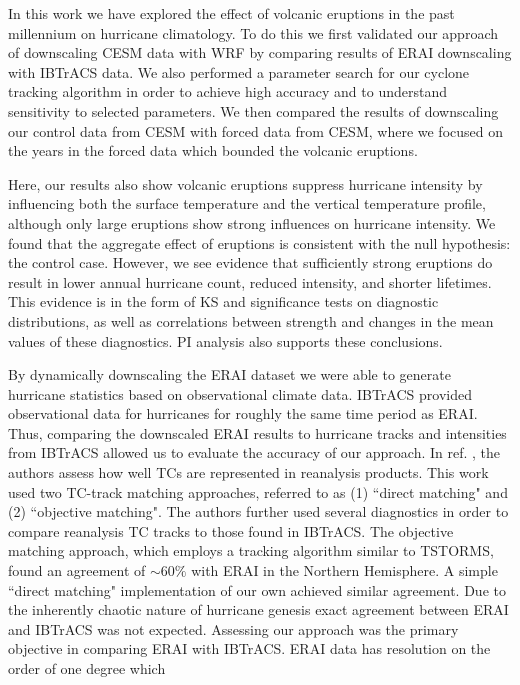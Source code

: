 \documentclass[phd,tocprelim]{cornell}
\begin{document}
In this work we have explored the effect of volcanic eruptions in 
the past millennium on hurricane climatology. To do this we first 
validated our approach of downscaling CESM data with WRF by comparing 
results of ERAI downscaling with IBTrACS data. We also performed a 
parameter search for our cyclone tracking algorithm in order to achieve 
high accuracy and to understand sensitivity to selected parameters. 
We then compared the results of downscaling our control data from CESM 
with forced data from CESM, where we focused on the years in the forced 
data which bounded the volcanic eruptions. 
\par
Here, our results also show volcanic eruptions suppress hurricane intensity by
influencing both the surface temperature and the vertical temperature
profile, although only large eruptions show strong influences on
hurricane intensity. We found that the aggregate effect of eruptions is 
consistent with the null hypothesis: the control case. However, we see evidence 
that sufficiently strong eruptions do result in lower annual hurricane count, 
reduced intensity, and shorter lifetimes. This evidence is in the form of 
KS and significance tests on diagnostic distributions, as well as 
correlations between strength and changes in the mean values of 
these diagnostics. PI analysis also supports these conclusions. 
\par
By dynamically downscaling the ERAI dataset we were able to generate 
hurricane statistics based on observational climate data. 
IBTrACS provided observational data for hurricanes for roughly the 
same time period as ERAI. Thus, comparing
the downscaled ERAI results to hurricane tracks and intensities from
IBTrACS allowed us to evaluate the accuracy of our approach. 
In ref. \cite{hodges2017well}, the authors assess how well TCs are
represented in reanalysis products. This work used two TC-track
matching approaches, referred to as (1) ``direct matching" and (2)
``objective matching". The authors further used several diagnostics in
order to compare reanalysis TC tracks to those found in IBTrACS. The
objective matching approach, which employs a tracking algorithm
similar to TSTORMS, found an agreement of ${\sim}60\%$ with ERAI in
the Northern Hemisphere. A simple ``direct matching" implementation of
our own achieved similar agreement. Due to the inherently chaotic nature 
of hurricane genesis exact agreement between ERAI and IBTrACS was not expected. 
Assessing our approach was the primary objective in comparing ERAI with 
IBTrACS. ERAI data has resolution on the order of one degree which 
\end{document}
